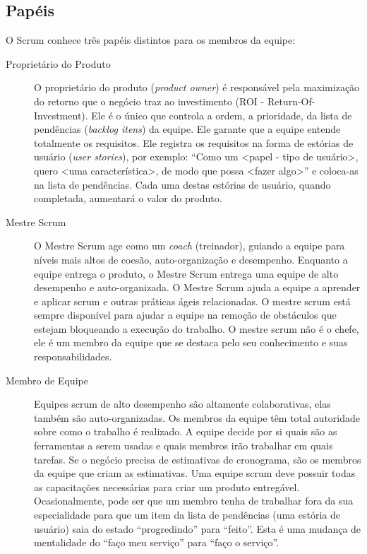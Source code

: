 \documentclass[
	11pt,				%
	openright,
	twoside,			%
	a4paper,			%
	english,			%
	french,
	brazil,				%
	sumario=tradicional
	]{abntex2}
\begin{document}
\subsection{Papéis}
O Scrum conhece três papéis distintos para os membros da equipe:
\begin{description}
\item[Proprietário do Produto] O proprietário do produto (\emph{product owner}) é responsável pela maximização do retorno que o negócio traz ao investimento (ROI - Return-Of-Investment). Ele é o único que controla a ordem, a prioridade, da lista de pendências (\textit{backlog itens}) da equipe. Ele garante que a equipe entende totalmente os requisitos. Ele registra os requisitos na forma de estórias de usuário (\emph{user stories}), por exemplo: ``Como um <papel - tipo de usuário>, quero <uma característica>, de modo que possa <fazer algo>'' e coloca-as na lista de pendências. Cada uma destas estórias de usuário, quando completada, aumentará o valor do produto.

\item[Mestre Scrum] O Mestre Scrum age como um \textit{coach} (treinador), guiando a equipe para níveis mais altos de coesão, auto-organização e desempenho. Enquanto a equipe entrega o produto, o Mestre Scrum entrega uma equipe de alto desempenho e auto-organizada. O Mestre Scrum ajuda a equipe a aprender e aplicar scrum e outras práticas ágeis relacionadas. O mestre scrum está sempre disponível para ajudar a equipe na remoção de obstáculos que estejam bloqueando a execução do trabalho. O mestre scrum não é o chefe, ele é um membro da equipe que se destaca pelo seu conhecimento e suas responsabilidades.

\item[Membro de Equipe] Equipes scrum de alto desempenho são altamente colaborativas, elas também são auto-organizadas. Os membros da equipe têm total autoridade sobre como o trabalho é realizado. A equipe decide por si quais são as ferramentas a serem usadas e quais membros irão trabalhar em quais tarefas. Se o negócio precisa de estimativas de cronograma, são os membros da equipe que criam as estimativas. Uma equipe scrum deve possuir todas as capacitações necessárias para criar um produto entregável. Ocasionalmente, pode ser que um membro tenha de trabalhar fora da sua especialidade para que um item da lista de pendências (uma estória de usuário) saia do estado ``progredindo'' para ``feito''. Esta é uma mudança de mentalidade do ``faço meu serviço'' para ``faço o serviço''. 

\end{description}
\end{document}
